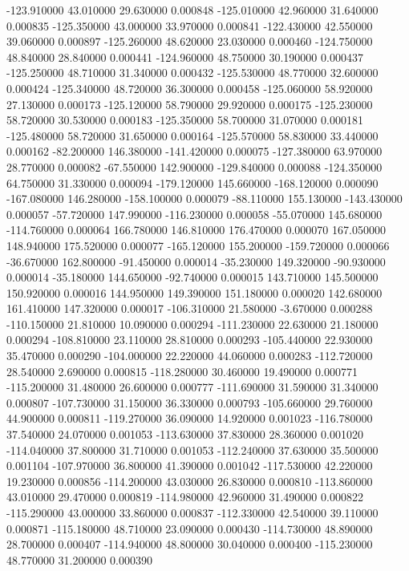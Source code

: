 -123.910000 43.010000 29.630000 0.000848 
-125.010000 42.960000 31.640000 0.000835 
-125.350000 43.000000 33.970000 0.000841 
-122.430000 42.550000 39.060000 0.000897 
-125.260000 48.620000 23.030000 0.000460 
-124.750000 48.840000 28.840000 0.000441 
-124.960000 48.750000 30.190000 0.000437 
-125.250000 48.710000 31.340000 0.000432 
-125.530000 48.770000 32.600000 0.000424 
-125.340000 48.720000 36.300000 0.000458 
-125.060000 58.920000 27.130000 0.000173 
-125.120000 58.790000 29.920000 0.000175 
-125.230000 58.720000 30.530000 0.000183 
-125.350000 58.700000 31.070000 0.000181 
-125.480000 58.720000 31.650000 0.000164 
-125.570000 58.830000 33.440000 0.000162 
-82.200000 146.380000 -141.420000 0.000075 
-127.380000 63.970000 28.770000 0.000082 
-67.550000 142.900000 -129.840000 0.000088 
-124.350000 64.750000 31.330000 0.000094 
-179.120000 145.660000 -168.120000 0.000090 
-167.080000 146.280000 -158.100000 0.000079 
-88.110000 155.130000 -143.430000 0.000057 
-57.720000 147.990000 -116.230000 0.000058 
-55.070000 145.680000 -114.760000 0.000064 
166.780000 146.810000 176.470000 0.000070 
167.050000 148.940000 175.520000 0.000077 
-165.120000 155.200000 -159.720000 0.000066 
-36.670000 162.800000 -91.450000 0.000014 
-35.230000 149.320000 -90.930000 0.000014 
-35.180000 144.650000 -92.740000 0.000015 
143.710000 145.500000 150.920000 0.000016 
144.950000 149.390000 151.180000 0.000020 
142.680000 161.410000 147.320000 0.000017 
-106.310000 21.580000 -3.670000 0.000288 
-110.150000 21.810000 10.090000 0.000294 
-111.230000 22.630000 21.180000 0.000294 
-108.810000 23.110000 28.810000 0.000293 
-105.440000 22.930000 35.470000 0.000290 
-104.000000 22.220000 44.060000 0.000283 
-112.720000 28.540000 2.690000 0.000815 
-118.280000 30.460000 19.490000 0.000771 
-115.200000 31.480000 26.600000 0.000777 
-111.690000 31.590000 31.340000 0.000807 
-107.730000 31.150000 36.330000 0.000793 
-105.660000 29.760000 44.900000 0.000811 
-119.270000 36.090000 14.920000 0.001023 
-116.780000 37.540000 24.070000 0.001053 
-113.630000 37.830000 28.360000 0.001020 
-114.040000 37.800000 31.710000 0.001053 
-112.240000 37.630000 35.500000 0.001104 
-107.970000 36.800000 41.390000 0.001042 
-117.530000 42.220000 19.230000 0.000856 
-114.200000 43.030000 26.830000 0.000810 
-113.860000 43.010000 29.470000 0.000819 
-114.980000 42.960000 31.490000 0.000822 
-115.290000 43.000000 33.860000 0.000837 
-112.330000 42.540000 39.110000 0.000871 
-115.180000 48.710000 23.090000 0.000430 
-114.730000 48.890000 28.700000 0.000407 
-114.940000 48.800000 30.040000 0.000400 
-115.230000 48.770000 31.200000 0.000390 
